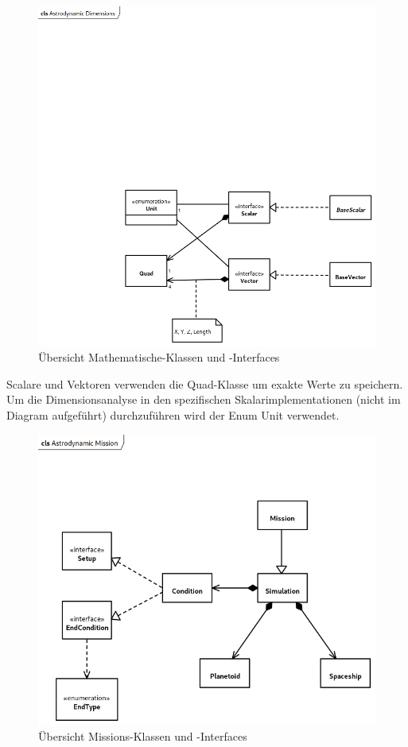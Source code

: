 \begin{figure}[H]
	\centering
	\includegraphics[width=12cm]{res/AstrodynamicDimensions.png}
	\caption{Übersicht Mathematische-Klassen und -Interfaces}
\end{figure}

Scalare und Vektoren verwenden die Quad-Klasse um exakte Werte zu speichern. Um die Dimensionsanalyse in den spezifischen Skalarimplementationen (nicht im Diagram aufgeführt) durchzuführen wird der Enum Unit verwendet.

\begin{figure}[H]
	\centering
	\includegraphics[width=12cm]{res/AstrodynamicMission.png}
	\caption{Übersicht Missions-Klassen und -Interfaces}
\end{figure}

